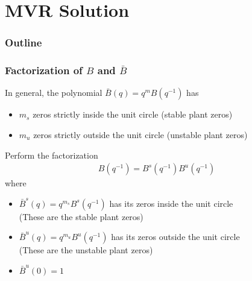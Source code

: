 \section{MVR Solution}
\begin{frame}
    \frametitle{Outline}
    \tableofcontents[currentsection]
\end{frame}

\begin{frame}
    \frametitle{Factorization of $B$ and $\bar{B}$}

    In general, the polynomial $\bar{B}(q) = q^m B(q^{-1})$ has
    \begin{itemize}
        \item
        $m_s$ zeros strictly inside the unit circle (stable plant zeros)

        \item
        $m_u$ zeros strictly outside the unit circle (unstable plant zeros)
    \end{itemize}
    \pause

    Perform the factorization
    \begin{align*}
        B(q^{-1}) = B^s(q^{-1}) B^u(q^{-1})
    \end{align*}
    where
    \begin{itemize}
        \item
        $\bar{B}^s(q) = q^{m_s} B^s(q^{-1})$ has its zeros inside the unit circle \\
        (These are the stable plant zeros)

        \item
        $\bar{B}^u(q) = q^{m_u} B^u(q^{-1})$ has its zeros outside the unit circle \\
        (These are the unstable plant zeros)

        \item
        $\bar{B}^u(0) = 1$
    \end{itemize}

\end{frame}

